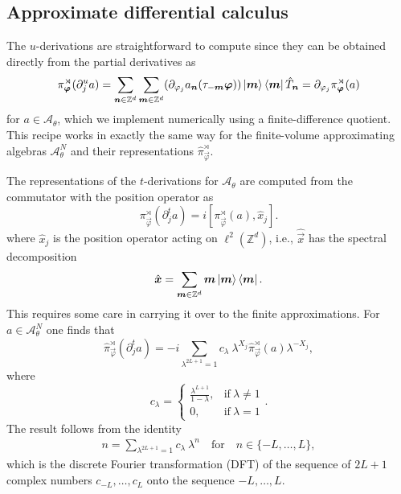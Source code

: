 \documentclass[submission, Phys]{SciPost}
\begin{document}
\subsection{Approximate differential calculus}
\label{subsec:approx_calculus}

The $u$-derivations are straightforward to compute since they can be obtained directly from the partial derivatives as
\begin{equation}
    \pi_{\boldsymbol{\varphi}}^\rtimes(\partial_j^u a) = \sum_{\boldsymbol{n}\in\mathbb{Z}^d} \sum_{\boldsymbol{m}\in\mathbb{Z}^d} (\partial_{\varphi_j} a_{\boldsymbol{n}}(\tau_{-\boldsymbol{m}} \boldsymbol{\varphi})) \ket{\boldsymbol{m}}\bra{\boldsymbol{m}} \hat{T}_{\boldsymbol{n}}
    = \partial_{\varphi_j}  \pi_{\boldsymbol{\varphi}}^\rtimes(a)
\end{equation}
for $a \in \mathscr{A}_\theta$, which we implement numerically using a finite-difference quotient. This recipe works in exactly the same way for the finite-volume approximating algebras $\mathcal{A}_\theta^N$ and their representations $\hat{\pi}^\rtimes_{\vec{\varphi}}$.

\noindent The representations of the $t$-derivations for $\mathscr{A}_\theta$ are computed from the commutator with the position operator as 
\begin{equation}
    \pi_{\vec{\varphi}}^\rtimes(\partial_j^t a) = i[\pi^\rtimes_{\vec{\varphi}}(a),\hat{x}_j] .
\end{equation}
where  $\hat{x}_j$ is the position operator acting on $\ell^2(\mathbb{Z}^d)$, i.e., $ \hat{\vec{x}}$ has the spectral decomposition
\begin{align}
    \hat{\boldsymbol{x}} = \sum_{\boldsymbol{m}\in \mathbb{Z}^d} \boldsymbol{m} \ket{\boldsymbol{m}}\bra{\boldsymbol{m}} .
\end{align}
This requires some care in carrying it over to the finite approximations. 
For $a\in\mathcal{A}_\theta^N$ one finds \cite[Prop 4.26]{Prodan2017} that
\begin{equation}
    \hat{\pi}^\rtimes_{\vec{\varphi}}(\partial_j^t a) = -i\sum_{\lambda^{2L+1}=1} c_\lambda\ \lambda^{X_j} \hat{\pi}^\rtimes_{\vec{\varphi}}(a)\lambda^{-X_j},
\end{equation}
where
\begin{equation}
    c_\lambda = \begin{cases}
\frac{\lambda^{L+1}}{1-\lambda}, & \text{if}\ \lambda\neq 1 \\
 0, & \text{if}\ \lambda=1
\end{cases}.
\end{equation}
The result follows from the identity
\begin{align}
    n = \sum_{\lambda^{2L+1}=1} c_\lambda\ \lambda^n \quad \text{for} \quad n\in \{-L,\dots,L\} ,
\end{align}
which is the discrete Fourier transformation (DFT) of the sequence of $2L+1$ complex numbers $c_{-L},\dots,c_L$ onto the sequence $-L,\dots,L$.
\end{document}
